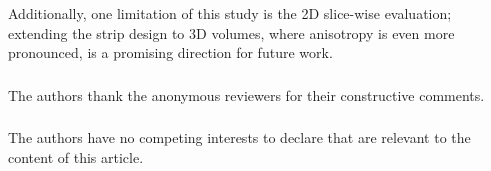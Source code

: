 \documentclass{llncs}
\begin{document}
Additionally, one limitation of this study is the 2D slice-wise evaluation; extending the strip design to 3D volumes, where anisotropy is even more pronounced, is a promising direction for future work.

\begin{credits}
\subsubsection{\ackname}
The authors thank the anonymous reviewers for their constructive comments.

\subsubsection{\discintname}
The authors have no competing interests to declare that are relevant to the content of this article.
\end{credits}

\clearpage



\end{document}
